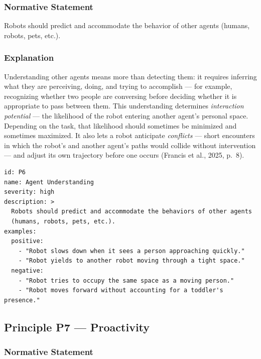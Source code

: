 \documentclass[utf8]{frontiers_suppmat} %
\begin{document}
\subsubsection{Normative Statement}\label{normative-statement-6}

Robots should predict and accommodate the behavior of other agents
(humans, robots, pets, etc.).

\subsubsection{Explanation}\label{explanation-6}

Understanding other agents means more than detecting them: it requires
inferring what they are perceiving, doing, and trying to accomplish ---
for example, recognizing whether two people are conversing before
deciding whether it is appropriate to pass between them. This
understanding determines \emph{interaction potential} --- the likelihood
of the robot entering another agent's personal space. Depending on the
task, that likelihood should sometimes be minimized and sometimes
maximized. It also lets a robot anticipate \emph{conflicts} --- short
encounters in which the robot's and another agent's paths would collide
without intervention --- and adjust its own trajectory before one occurs
(Francis et al., 2025, p.~8).

\begin{lstlisting}[style=literatecard]
id: P6
name: Agent Understanding
severity: high
description: >
  Robots should predict and accommodate the behaviors of other agents
  (humans, robots, pets, etc.).
examples:
  positive:
    - "Robot slows down when it sees a person approaching quickly."
    - "Robot yields to another robot moving through a tight space."
  negative:
    - "Robot tries to occupy the same space as a moving person."
    - "Robot moves forward without accounting for a toddler's presence."
\end{lstlisting}

\subsection{Principle P7 ---
Proactivity}\label{principle-p7-proactivity}

\subsubsection{Normative Statement}\label{normative-statement-7}
\end{document}
